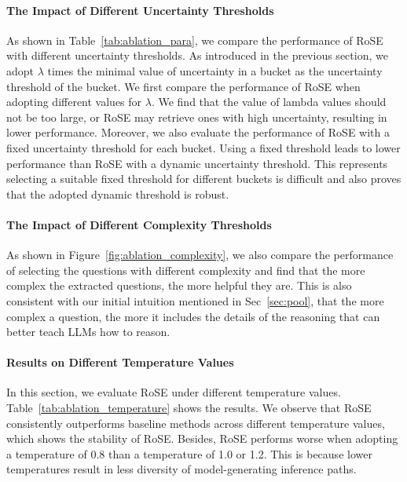 \documentclass[11pt]{article}
\begin{document}


\paragraph{The Impact of Different Uncertainty Thresholds} As shown in Table~\ref{tab:ablation_para}, we compare the performance of RoSE with different uncertainty thresholds. As introduced in the previous section, we adopt $\lambda$ times the minimal value of uncertainty in a bucket as the uncertainty threshold of the bucket. We first compare the performance of RoSE when adopting different values for $\lambda$. We find that the value of lambda values should not be too large, or RoSE may retrieve ones with high uncertainty, resulting in lower performance. Moreover, we also evaluate the performance of RoSE with a fixed uncertainty threshold for each bucket. Using a fixed threshold leads to lower performance than RoSE with a dynamic uncertainty threshold. This represents selecting a suitable fixed threshold for different buckets is difficult and also proves that the adopted dynamic threshold is robust.

\paragraph{The Impact of Different Complexity Thresholds} As shown in Figure~\ref{fig:ablation_complexity}, we also compare the performance of selecting the questions with different complexity and find that the more complex the extracted questions, the more helpful they are. This is also consistent with our initial intuition mentioned in Sec~\ref{sec:pool}, that the more complex a question, the more it includes the details of the reasoning that can better teach LLMs how to reason.

\paragraph{Results on Different Temperature Values} In this section, we evaluate RoSE under different temperature values. Table~\ref{tab:ablation_temperature} shows the results. We observe that RoSE consistently outperforms baseline methods across different temperature values, which shows the stability of RoSE. Besides, RoSE performs worse when adopting a temperature of 0.8 than a temperature of 1.0 or 1.2. This is because lower temperatures result in less diversity of model-generating inference paths.
\end{document}

